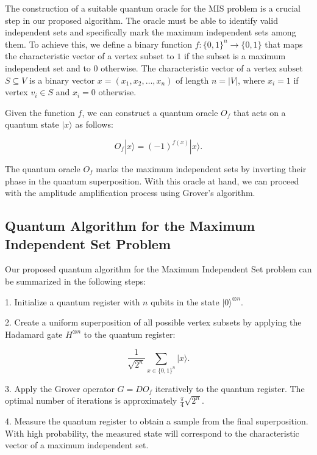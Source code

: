 The construction of a suitable quantum oracle for the MIS problem is a crucial step in our proposed algorithm. The oracle must be able to identify valid independent sets and specifically mark the maximum independent sets among them. To achieve this, we define a binary function $f: \{0, 1\}^n \rightarrow \{0, 1\}$ that maps the characteristic vector of a vertex subset to $1$ if the subset is a maximum independent set and to $0$ otherwise. The characteristic vector of a vertex subset $S \subseteq V$ is a binary vector $x = (x_1, x_2, \dots, x_n)$ of length $n = |V|$, where $x_i = 1$ if vertex $v_i \in S$ and $x_i = 0$ otherwise.

Given the function $f$, we can construct a quantum oracle $O_f$ that acts on a quantum state $|x\rangle$ as follows:

\begin{equation}
O_f |x\rangle = (-1)^{f(x)} |x\rangle.
\end{equation}

The quantum oracle $O_f$ marks the maximum independent sets by inverting their phase in the quantum superposition. With this oracle at hand, we can proceed with the amplitude amplification process using Grover's algorithm.

\subsection{Quantum Algorithm for the Maximum Independent Set Problem}
\label{subsec:quantum_algorithm_mis}

Our proposed quantum algorithm for the Maximum Independent Set problem can be summarized in the following steps:

1. Initialize a quantum register with $n$ qubits in the state $|0\rangle^{\otimes n}$.

2. Create a uniform superposition of all possible vertex subsets by applying the Hadamard gate $H^{\otimes n}$ to the quantum register:

\begin{equation}
\frac{1}{\sqrt{2^n}} \sum_{x \in \{0, 1\}^n} |x\rangle.
\end{equation}

3. Apply the Grover operator $G = D O_f$ iteratively to the quantum register. The optimal number of iterations is approximately $\frac{\pi}{4}\sqrt{2^n}$.

4. Measure the quantum register to obtain a sample from the final superposition. With high probability, the measured state will correspond to the characteristic vector of a maximum independent set.

